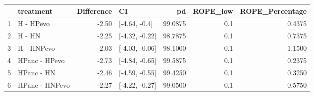 \begin{table}[ht]
\centering
\begin{tabular}{llrlrrr}
  \hline
 & treatment & Difference & CI & pd & ROPE\_low & ROPE\_Percentage \\ 
  \hline
1 & H - HPevo & -2.50 & [-4.64, -0.4] & 99.0875 & 0.1 & 0.4375 \\ 
  2 & H - HN & -2.25 & [-4.32, -0.22] & 98.7875 & 0.1 & 0.7375 \\ 
  3 & H - HNPevo & -2.03 & [-4.03, -0.06] & 98.1000 & 0.1 & 1.1500 \\ 
  4 & HPanc - HPevo & -2.73 & [-4.84, -0.65] & 99.5875 & 0.1 & 0.2375 \\ 
  5 & HPanc - HN & -2.46 & [-4.59, -0.55] & 99.4250 & 0.1 & 0.3250 \\ 
  6 & HPanc - HNPevo & -2.27 & [-4.22, -0.27] & 99.0500 & 0.1 & 0.5750 \\ 
   \hline
\end{tabular}
\end{table}

